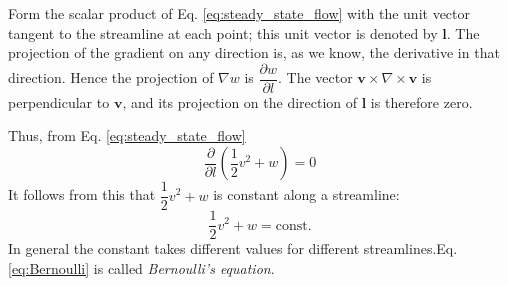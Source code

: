 \documentclass[conference]{IEEEtran}
\theoremstyle{definition}
\theoremstyle{remark}
\begin{document}
    Form the scalar product of Eq. \ref{eq:steady_state_flow} with the unit vector tangent to the streamline at each point; this unit vector is denoted by $\mathbf{l}$. The projection of the gradient on any direction is, as we know, the derivative in that direction. Hence the projection of $\nabla w$ is $\dfrac{\partial w}{\partial l}$. The vector $\mathbf{v} \times \nabla \times \mathbf{v}$ is perpendicular to $\mathbf{v}$, and its projection on the direction of $\mathbf{l}$ is therefore zero.

    Thus, from Eq. \ref{eq:steady_state_flow}
    \begin{equation*}
        \dfrac{\partial}{\partial l} \left( \dfrac12 v^2 + w \right) = 0
    \end{equation*}
    It follows from this that $\dfrac12 v^2 + w$ is constant along a streamline:
    \begin{equation}
        \dfrac12 v^2 + w = \text{const.}
        \label{eq:Bernoulli}
    \end{equation}
    In general the constant takes different values for different streamlines.Eq. \ref{eq:Bernoulli} is called \emph{Bernoulli's equation}.
\end{document}
